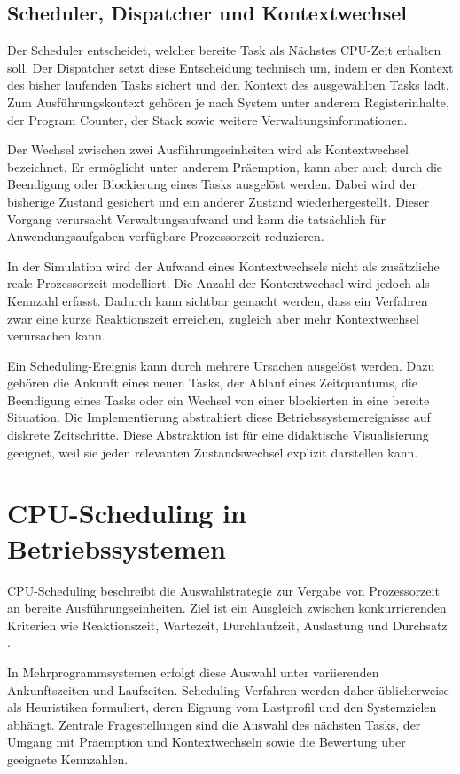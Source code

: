 \subsection{Scheduler, Dispatcher und Kontextwechsel}

Der Scheduler entscheidet, welcher bereite Task als Nächstes CPU-Zeit erhalten soll. Der Dispatcher setzt diese Entscheidung technisch um, indem er den Kontext des bisher laufenden Tasks sichert und den Kontext des ausgewählten Tasks lädt. Zum Ausführungskontext gehören je nach System unter anderem Registerinhalte, der Program Counter, der Stack sowie weitere Verwaltungsinformationen.

Der Wechsel zwischen zwei Ausführungseinheiten wird als Kontextwechsel bezeichnet. Er ermöglicht unter anderem Präemption, kann aber auch durch die Beendigung oder Blockierung eines Tasks ausgelöst werden. Dabei wird der bisherige Zustand gesichert und ein anderer Zustand wiederhergestellt. Dieser Vorgang verursacht Verwaltungsaufwand und kann die tatsächlich für Anwendungsaufgaben verfügbare Prozessorzeit reduzieren.

In der Simulation wird der Aufwand eines Kontextwechsels nicht als zusätzliche reale Prozessorzeit modelliert. Die Anzahl der Kontextwechsel wird jedoch als Kennzahl erfasst. Dadurch kann sichtbar gemacht werden, dass ein Verfahren zwar eine kurze Reaktionszeit erreichen, zugleich aber mehr Kontextwechsel verursachen kann.

Ein Scheduling-Ereignis kann durch mehrere Ursachen ausgelöst werden. Dazu gehören die Ankunft eines neuen Tasks, der Ablauf eines Zeitquantums, die Beendigung eines Tasks oder ein Wechsel von einer blockierten in eine bereite Situation. Die Implementierung abstrahiert diese Betriebssystemereignisse auf diskrete Zeitschritte. Diese Abstraktion ist für eine didaktische Visualisierung geeignet, weil sie jeden relevanten Zustandswechsel explizit darstellen kann.

\section{CPU-Scheduling in Betriebssystemen}

CPU-Scheduling beschreibt die Auswahlstrategie zur Vergabe von Prozessorzeit an bereite Ausführungseinheiten. Ziel ist ein Ausgleich zwischen konkurrierenden Kriterien wie Reaktionszeit, Wartezeit, Durchlaufzeit, Auslastung und Durchsatz \cite{stallings_betriebssysteme}.

In Mehrprogrammsystemen erfolgt diese Auswahl unter variierenden Ankunftszeiten und Laufzeiten. Scheduling-Verfahren werden daher üblicherweise als Heuristiken formuliert, deren Eignung vom Lastprofil und den Systemzielen abhängt. Zentrale Fragestellungen sind die Auswahl des nächsten Tasks, der Umgang mit Präemption und Kontextwechseln sowie die Bewertung über geeignete Kennzahlen.

